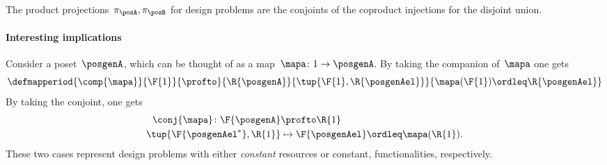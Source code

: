 \begin{example}
    The product projections~$\pi_\posA, \pi_\posB$ for design problems are the conjoints of the coproduct injections for the disjoint union.
\end{example}

\paragraph{Interesting implications}
Consider a poset~$\posgenA$, which can be thought of as a map~$\mapa \colon 1\to \posgenA$.
By taking the companion of~$\mapa$ one gets
\begin{equation}
    \defmapperiod{
        \comp{\mapa}
    }{
        \F{1}
    }{
        \profto
    }{
        \R{\posgenA}
    }{
        \tup{\F{1},\R{\posgenAel}}
    }{
        \mapa(\F{1})\ordleq \R{\posgenAel}
    }
\end{equation}
By taking the conjoint, one gets
\begin{equation}
    \begin{aligned}
        \conj{\mapa}\colon \F{\posgenA} & \profto \R{1}                               \\
        \tup{\F{\posgenAel^*},\R{1}}    & \mapsto \F{\posgenAel}\ordleq \mapa(\R{1}).
    \end{aligned}
\end{equation}
These two cases represent design problems with either \emph{constant} resources or constant, functionalities, respectively.
